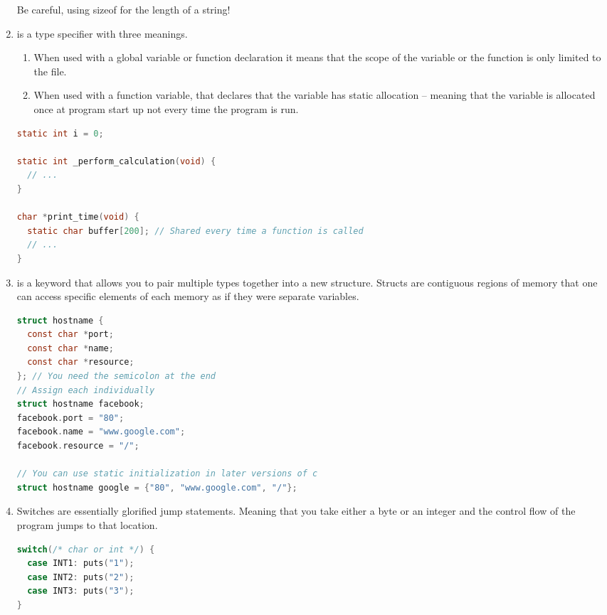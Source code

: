 \begin{enumerate}
	      Be careful, using sizeof for the length of a string!

	\item {} is a type specifier with three meanings.

	      \begin{enumerate}
		      \item When used with a global variable or function declaration it means that the scope of the variable or the function is only limited to the file.
		      \item When used with a function variable, that declares that the variable has static allocation -- meaning that the variable is allocated once at program start up not every time the program is run.
	      \end{enumerate}

	      \begin{lstlisting}[language=C]
static int i = 0;

static int _perform_calculation(void) {
  // ...
}

char *print_time(void) {
  static char buffer[200]; // Shared every time a function is called
  // ...
}
\end{lstlisting}

	    \item {} is a keyword that allows you to pair multiple types together into a new structure.
        Structs are contiguous regions of memory that one can access specific elements of each memory as if they were separate variables.

	      \begin{lstlisting}[language=C]
struct hostname {
  const char *port;
  const char *name;
  const char *resource;
}; // You need the semicolon at the end
// Assign each individually
struct hostname facebook;
facebook.port = "80";
facebook.name = "www.google.com";
facebook.resource = "/";

// You can use static initialization in later versions of c
struct hostname google = {"80", "www.google.com", "/"};
\end{lstlisting}


	    \item {} Switches are essentially glorified jump statements.
        Meaning that you take either a byte or an integer and the control flow of the program jumps to that location.
	      \\
	      \begin{lstlisting}[language=C]
switch(/* char or int */) {
  case INT1: puts("1");
  case INT2: puts("2");
  case INT3: puts("3");
}
\end{lstlisting}


\end{enumerate}

